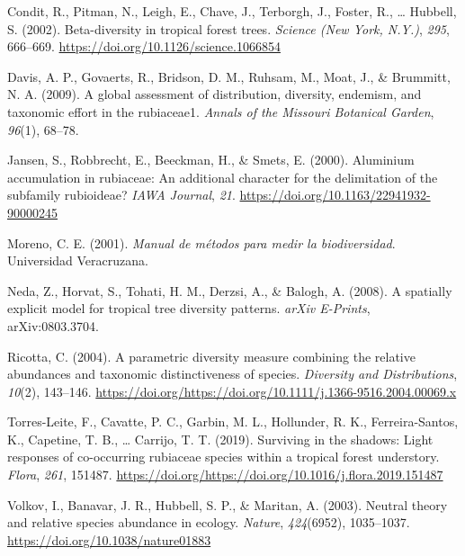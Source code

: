 \documentclass[11pt,]{article}
\begin{document}
\hypertarget{refs}{}
\hypertarget{ref-article_condit}{}
Condit, R., Pitman, N., Leigh, E., Chave, J., Terborgh, J., Foster, R.,
\ldots{} Hubbell, S. (2002). Beta-diversity in tropical forest trees.
\emph{Science (New York, N.Y.)}, \emph{295}, 666--669.
\url{https://doi.org/10.1126/science.1066854}

\hypertarget{ref-davis2009global}{}
Davis, A. P., Govaerts, R., Bridson, D. M., Ruhsam, M., Moat, J., \&
Brummitt, N. A. (2009). A global assessment of distribution, diversity,
endemism, and taxonomic effort in the rubiaceae1. \emph{Annals of the
Missouri Botanical Garden}, \emph{96}(1), 68--78.

\hypertarget{ref-article}{}
Jansen, S., Robbrecht, E., Beeckman, H., \& Smets, E. (2000). Aluminium
accumulation in rubiaceae: An additional character for the delimitation
of the subfamily rubioideae? \emph{IAWA Journal}, \emph{21}.
\url{https://doi.org/10.1163/22941932-90000245}

\hypertarget{ref-moreno2001manual}{}
Moreno, C. E. (2001). \emph{Manual de métodos para medir la
biodiversidad}. Universidad Veracruzana.

\hypertarget{ref-2008arXiv0803.3704N}{}
Neda, Z., Horvat, S., Tohati, H. M., Derzsi, A., \& Balogh, A. (2008). A
spatially explicit model for tropical tree diversity patterns.
\emph{arXiv E-Prints}, arXiv:0803.3704.

\hypertarget{ref-https:ux2fux2fdoi.orgux2f10.1111ux2fj.1366-9516.2004.00069.x}{}
Ricotta, C. (2004). A parametric diversity measure combining the
relative abundances and taxonomic distinctiveness of species.
\emph{Diversity and Distributions}, \emph{10}(2), 143--146.
\url{https://doi.org/https://doi.org/10.1111/j.1366-9516.2004.00069.x}

\hypertarget{ref-TORRESLEITE2019151487}{}
Torres-Leite, F., Cavatte, P. C., Garbin, M. L., Hollunder, R. K.,
Ferreira-Santos, K., Capetine, T. B., \ldots{} Carrijo, T. T. (2019).
Surviving in the shadows: Light responses of co-occurring rubiaceae
species within a tropical forest understory. \emph{Flora}, \emph{261},
151487.
\url{https://doi.org/https://doi.org/10.1016/j.flora.2019.151487}

\hypertarget{ref-Volkov_2003}{}
Volkov, I., Banavar, J. R., Hubbell, S. P., \& Maritan, A. (2003).
Neutral theory and relative species abundance in ecology. \emph{Nature},
\emph{424}(6952), 1035--1037. \url{https://doi.org/10.1038/nature01883}




\newpage
\singlespacing 
\end{document}
